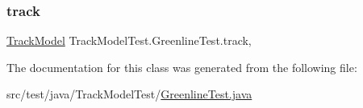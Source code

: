 \mbox{\label{classTrackModelTest_1_1GreenlineTest_afbfade7894862ab761d49ad840142241}} 
\subsubsection{\texorpdfstring{track}{track}}
{\footnotesize\ttfamily \hyperlink{classTrackModel_1_1TrackModel}{Track\+Model} Track\+Model\+Test.\+Greenline\+Test.\+track\hspace{0.3cm}{\ttfamily [static]}, {\ttfamily [private]}}



The documentation for this class was generated from the following file\+:\begin{DoxyCompactItemize}
\item 
src/test/java/\+Track\+Model\+Test/\hyperlink{GreenlineTest_8java}{Greenline\+Test.\+java}\end{DoxyCompactItemize}
